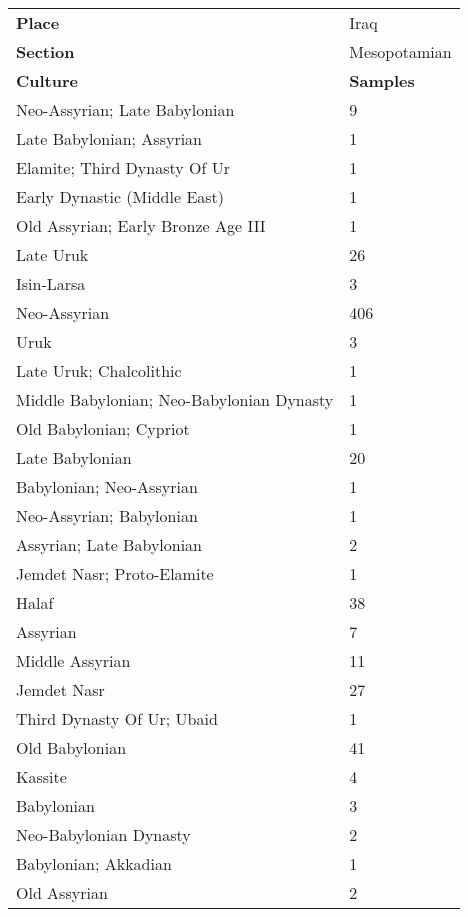 \documentclass[11pt]{article}
\begin{document}
\begin{table}[ht!]
    \centering
    \small
    \begin{tabularx}{\columnwidth}{Xl}
        \hline
        \rowcolor{brown!30} \textbf{Place} & Iraq \\
        \rowcolor{brown!20} \textbf{Section} & Mesopotamian \\
        \hline
        \rowcolor{brown!10} \textbf{Culture} & \textbf{Samples} \\
        \hline
        Neo-Assyrian; Late Babylonian & 9 \\
        Late Babylonian; Assyrian & 1 \\
        Elamite; Third Dynasty Of Ur & 1 \\
        Early Dynastic (Middle East) & 1 \\
        Old Assyrian; Early Bronze Age III & 1 \\
        Late Uruk & 26 \\
        Isin-Larsa & 3 \\
        Neo-Assyrian & 406 \\
        Uruk & 3 \\
        Late Uruk; Chalcolithic & 1 \\
        Middle Babylonian; Neo-Babylonian Dynasty & 1 \\
        Old Babylonian; Cypriot & 1 \\
        Late Babylonian & 20 \\
        Babylonian; Neo-Assyrian & 1 \\
        Neo-Assyrian; Babylonian & 1 \\
        Assyrian; Late Babylonian & 2 \\
        Jemdet Nasr; Proto-Elamite & 1 \\
        Halaf & 38 \\
        Assyrian & 7 \\
        Middle Assyrian & 11 \\
        Jemdet Nasr & 27 \\
        Third Dynasty Of Ur; Ubaid & 1 \\
        Old Babylonian & 41 \\
        Kassite & 4 \\
        Babylonian & 3 \\
        Neo-Babylonian Dynasty & 2 \\
        Babylonian; Akkadian & 1 \\
        Old Assyrian & 2 \\

\end{tabularx}
\end{table}
\end{document}
